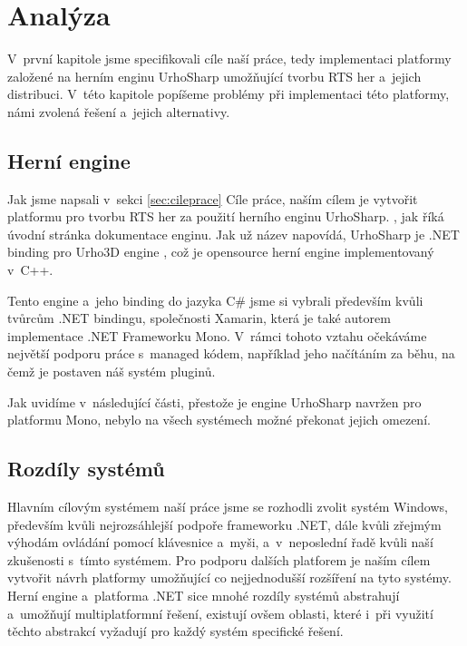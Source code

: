 \chapter{Analýza}
V~první kapitole jsme specifikovali cíle naší práce, tedy implementaci platformy založené na herním enginu UrhoSharp umožňující tvorbu RTS her a~jejich distribuci. V~této kapitole popíšeme problémy při implementaci této platformy, námi zvolená řešení a~jejich alternativy.

\section{Herní engine}
Jak jsme napsali v~sekci \ref{sec:cileprace} Cíle práce, naším cílem je vytvořit platformu pro tvorbu RTS her za použití herního enginu UrhoSharp. \textit{ } \citep{site:urhosharp}, jak říká úvodní stránka dokumentace enginu. Jak už název napovídá, UrhoSharp je .NET binding pro Urho3D engine \citep{site:urho3D}, což je opensource herní engine implementovaný v~C++.

Tento engine a~jeho binding do jazyka C\# jsme si vybrali především kvůli tvůrcům .NET bindingu, společnosti Xamarin, která je také autorem implementace .NET Frameworku Mono. V~rámci tohoto vztahu očekáváme největší podporu práce s~managed kódem, například jeho načítáním za běhu, na čemž je postaven náš systém pluginů. 

Jak uvidíme v~následující části, přestože je engine UrhoSharp navržen pro platformu Mono, nebylo na všech systémech možné překonat jejich omezení.

\section{Rozdíly systémů}
\label{sec:system_dif}
Hlavním cílovým systémem naší práce jsme se rozhodli zvolit systém Windows, především kvůli nejrozsáhlejší podpoře frameworku .NET, dále kvůli zřejmým výhodám ovládání pomocí klávesnice a~myši, a~v~neposlední řadě kvůli naší zkušenosti s~tímto systémem. Pro podporu dalších platforem je naším cílem vytvořit návrh platformy umožňující co nejjednodušší rozšíření na tyto systémy. Herní engine a~platforma .NET sice mnohé rozdíly systémů abstrahují a~umožňují multiplatformní řešení, existují ovšem oblasti, které i~při využití těchto abstrakcí vyžadují pro každý systém specifické řešení.  

